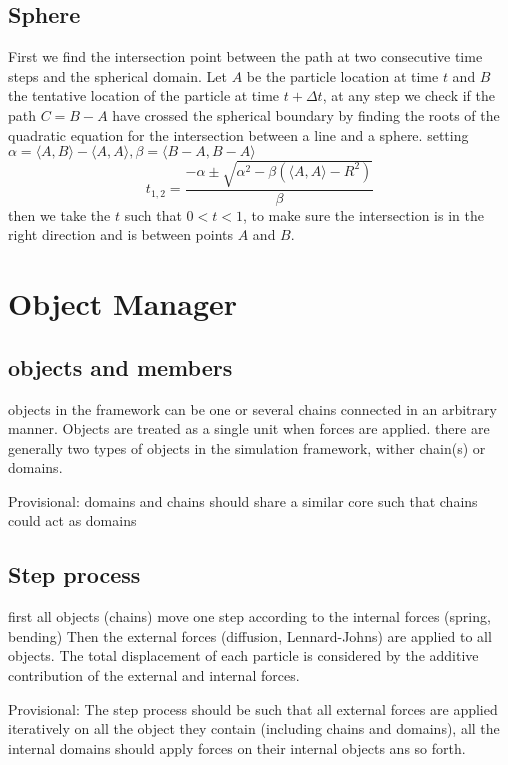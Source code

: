 \documentclass[12pt]{report}
\begin{document}
\subsection{Sphere}
First we find the intersection point between the path at two consecutive time steps and the spherical domain. Let $A$ be the particle location at time $t$ and $B$ the tentative location of the particle at time $t+\Delta t$, at any step we check if the path $C=B-A$ have crossed the spherical boundary by finding the roots of the quadratic equation for the intersection between a line and a sphere. setting $\alpha= \langle A,B \rangle -\langle A,A \rangle , \beta = \langle B-A,B-A \rangle$
\begin{equation*}
t_{1,2}=\frac{-\alpha \pm \sqrt{\alpha^2-\beta (\langle A,A \rangle -R^2)}}{\beta}
\end{equation*}
then we take the $t$ such that $0<t<1$, to make sure the intersection is in the right direction and is between points $A$ and $B$.

\section{Object Manager}
\subsection{objects and members}
objects in the framework can be one or several chains connected in an arbitrary manner. Objects are treated as a single unit when forces are applied. 
there are generally two types of objects in the simulation framework, wither  chain(s) or domains. 

Provisional: domains and chains should share a similar core such that chains could act as domains 

\subsection{Step process}
first all objects (chains) move one step according to the internal forces (spring, bending)
Then the external forces (diffusion, Lennard-Johns) are applied to all objects. 
The total displacement of each particle is considered by the additive contribution of the external and internal forces. 

Provisional: The step process should be such that all external forces are applied iteratively on all the object they contain (including chains and domains), all the internal domains should apply forces on their internal objects ans so forth. 
\end{document}
